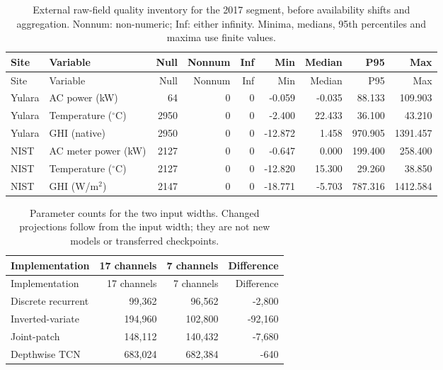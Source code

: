 \begin{longtable}{llrrrrrrr}
\caption{External raw-field quality inventory for the 2017 segment, before availability shifts and aggregation. Nonnum: non-numeric; Inf: either infinity. Minima, medians, 95th percentiles and maxima use finite values.}\label{tabs:quality}\\
\toprule Site & Variable & Null & Nonnum & Inf & Min & Median & P95 & Max\\\midrule
\endfirsthead\toprule Site & Variable & Null & Nonnum & Inf & Min & Median & P95 & Max\\\midrule\endhead
Yulara & AC power (kW) & 64 & 0 & 0 & -0.059 & -0.035 & 88.133 & 109.903\\
Yulara & Temperature ($^\circ$C) & 2950 & 0 & 0 & -2.400 & 22.433 & 36.100 & 43.210\\
Yulara & GHI (native) & 2950 & 0 & 0 & -12.872 & 1.458 & 970.905 & 1391.457\\
NIST & AC meter power (kW) & 2127 & 0 & 0 & -0.647 & 0.000 & 199.400 & 258.400\\
NIST & Temperature ($^\circ$C) & 2127 & 0 & 0 & -12.820 & 15.300 & 29.260 & 38.850\\
NIST & GHI (W/m$^2$) & 2147 & 0 & 0 & -18.771 & -5.703 & 787.316 & 1412.584\\
\bottomrule\end{longtable}
\begin{longtable}{lrrr}
\caption{Parameter counts for the two input widths. Changed projections follow from the input width; they are not new models or transferred checkpoints.}\label{tabs:parameters}\\
\toprule Implementation & 17 channels & 7 channels & Difference\\\midrule
\endfirsthead\toprule Implementation & 17 channels & 7 channels & Difference\\\midrule\endhead
Discrete recurrent & 99,362 & 96,562 & -2,800\\
Inverted-variate & 194,960 & 102,800 & -92,160\\
Joint-patch & 148,112 & 140,432 & -7,680\\
Depthwise TCN & 683,024 & 682,384 & -640\\
\bottomrule\end{longtable}
